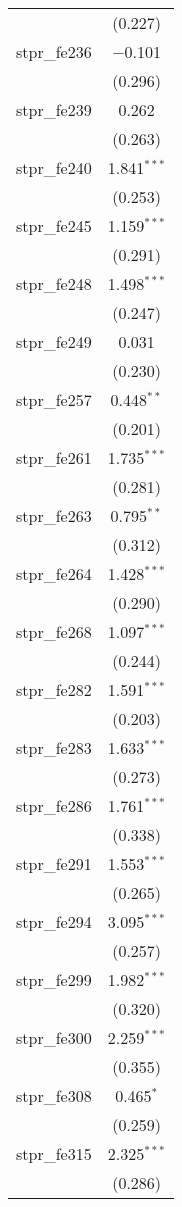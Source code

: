 \begin{table}[!htbp]
\begin{tabular}{@{\extracolsep{5pt}}lc}
  & (0.227) \\ 
  stpr\_fe236 & $-$0.101 \\ 
  & (0.296) \\ 
  stpr\_fe239 & 0.262 \\ 
  & (0.263) \\ 
  stpr\_fe240 & 1.841$^{***}$ \\ 
  & (0.253) \\ 
  stpr\_fe245 & 1.159$^{***}$ \\ 
  & (0.291) \\ 
  stpr\_fe248 & 1.498$^{***}$ \\ 
  & (0.247) \\ 
  stpr\_fe249 & 0.031 \\ 
  & (0.230) \\ 
  stpr\_fe257 & 0.448$^{**}$ \\ 
  & (0.201) \\ 
  stpr\_fe261 & 1.735$^{***}$ \\ 
  & (0.281) \\ 
  stpr\_fe263 & 0.795$^{**}$ \\ 
  & (0.312) \\ 
  stpr\_fe264 & 1.428$^{***}$ \\ 
  & (0.290) \\ 
  stpr\_fe268 & 1.097$^{***}$ \\ 
  & (0.244) \\ 
  stpr\_fe282 & 1.591$^{***}$ \\ 
  & (0.203) \\ 
  stpr\_fe283 & 1.633$^{***}$ \\ 
  & (0.273) \\ 
  stpr\_fe286 & 1.761$^{***}$ \\ 
  & (0.338) \\ 
  stpr\_fe291 & 1.553$^{***}$ \\ 
  & (0.265) \\ 
  stpr\_fe294 & 3.095$^{***}$ \\ 
  & (0.257) \\ 
  stpr\_fe299 & 1.982$^{***}$ \\ 
  & (0.320) \\ 
  stpr\_fe300 & 2.259$^{***}$ \\ 
  & (0.355) \\ 
  stpr\_fe308 & 0.465$^{*}$ \\ 
  & (0.259) \\ 
  stpr\_fe315 & 2.325$^{***}$ \\ 
  & (0.286) \\ 

\end{tabular}
\end{table}
